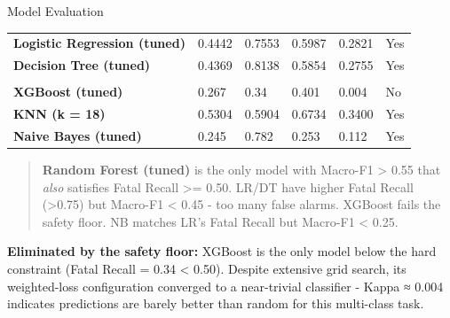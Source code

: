 \documentclass[
  ignorenonframetext,
]{beamer}
\begin{document}
\begin{frame}{Model Evaluation}
\label{model-evaluation}
\begingroup\fontsize{13}{15}\selectfont

\begin{longtabu} to 
\toprule
{} &  &  &  &  & \\
\midrule
\textbf{Logistic Regression (tuned)} & 0.4442 & \textcolor[HTML]{d62728}{0.7553} & 0.5987 & 0.2821 & Yes\\
\textbf{Decision Tree (tuned)} & 0.4369 & \textcolor[HTML]{d62728}{0.8138} & 0.5854 & 0.2755 & Yes\\
\textbf{} &  & \textcolor[HTML]{d62728}{} &  &  & \\
\textbf{XGBoost (tuned)} & 0.267 & \textcolor[HTML]{d62728}{0.34} & 0.401 & 0.004 & No\\
\textbf{KNN (k = 18)} & 0.5304 & \textcolor[HTML]{d62728}{0.5904} & 0.6734 & 0.3400 & Yes\\
\addlinespace
\textbf{Naive Bayes (tuned)} & 0.245 & \textcolor[HTML]{d62728}{0.782} & 0.253 & 0.112 & Yes\\
\bottomrule
\end{longtabu}
\endgroup{}

\begin{quote}
\textbf{Random Forest (tuned)} is the only model with Macro-F1
\textgreater{} 0.55 that \emph{also} satisfies Fatal Recall
\textgreater= 0.50. LR/DT have higher Fatal Recall (\textgreater0.75)
but Macro-F1 \textless{} 0.45 - too many false alarms. XGBoost fails the
safety floor. NB matches LR's Fatal Recall but Macro-F1 \textless{}
0.25.
\end{quote}

\textbf{Eliminated by the safety floor:} XGBoost is the only model below
the hard constraint (Fatal Recall = 0.34 \textless{} 0.50). Despite
extensive grid search, its weighted-loss configuration converged to a
near-trivial classifier - Kappa ≈ 0.004 indicates predictions are barely
better than random for this multi-class task.


\end{frame}
\end{document}
